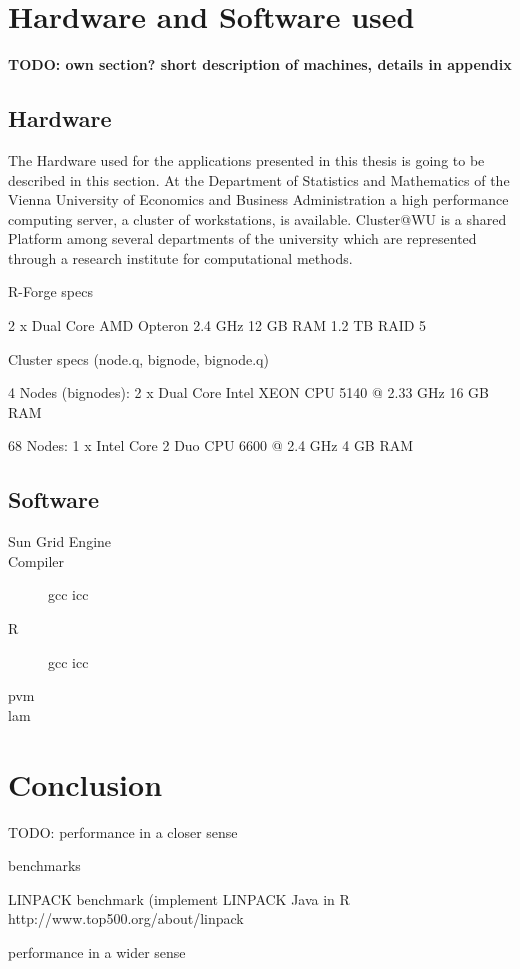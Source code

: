 \section{Hardware and Software used}

\textbf{TODO: own section? short description of machines, details in
  appendix}

\subsection{Hardware}
The Hardware used for the applications presented in this thesis is
going to be described in this section.
At the Department of Statistics and Mathematics of the Vienna
University of Economics and Business Administration a high performance
computing server, a cluster of workstations, is
available. Cluster@WU is a shared Platform among several departments
of the university which are represented through a research institute
for computational methods. 
\begin{table}

\end{table}
R-Forge specs

2 x Dual Core AMD Opteron 2.4 GHz
12 GB RAM
1.2 TB RAID 5

Cluster specs (node.q, bignode, bignode.q)

4 Nodes (bignodes):
2 x Dual Core Intel XEON CPU 5140 @ 2.33 GHz
16 GB RAM

68 Nodes:
1 x Intel Core 2 Duo CPU 6600 @ 2.4 GHz
4 GB RAM

\subsection{Software}

\begin{description}
\item[Sun Grid Engine]
\item[Compiler] gcc icc
\item[R] gcc icc
\item[pvm]
\item[lam]
\end{description}

\section{Conclusion}

TODO: performance in a closer sense

      benchmarks

      LINPACK benchmark (implement LINPACK Java in R
      http://www.top500.org/about/linpack

      performance in a wider sense
